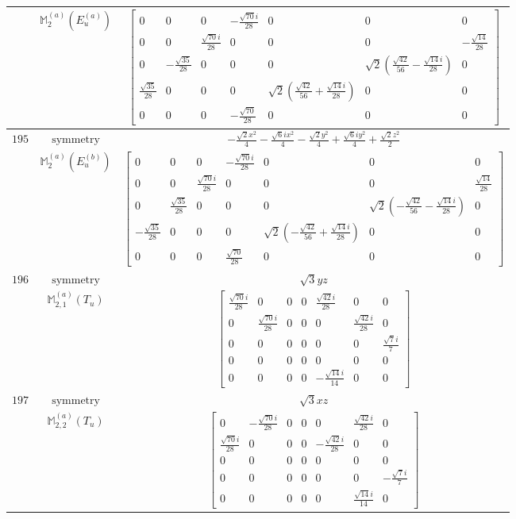 \documentclass[fleqn,8pt,landscape]{jsarticle}
\begin{document}
\begin{longtable}{ccc}
$  $ & $ \mathbb{M}_{2}^{(a)}(E_{u}^{(a)}) $ & $ \begin{bmatrix} 0 & 0 & 0 & - \frac{\sqrt{70} i}{28} & 0 & 0 & 0 \\ 0 & 0 & \frac{\sqrt{70} i}{28} & 0 & 0 & 0 & - \frac{\sqrt{14}}{28} \\ 0 & - \frac{\sqrt{35}}{28} & 0 & 0 & 0 & \sqrt{2} \left(\frac{\sqrt{42}}{56} - \frac{\sqrt{14} i}{28}\right) & 0 \\ \frac{\sqrt{35}}{28} & 0 & 0 & 0 & \sqrt{2} \left(\frac{\sqrt{42}}{56} + \frac{\sqrt{14} i}{28}\right) & 0 & 0 \\ 0 & 0 & 0 & - \frac{\sqrt{70}}{28} & 0 & 0 & 0 \end{bmatrix} $ \\ \hline
$ 195 $ & $ \text{symmetry} $ & $ - \frac{\sqrt{2} x^{2}}{4} - \frac{\sqrt{6} i x^{2}}{4} - \frac{\sqrt{2} y^{2}}{4} + \frac{\sqrt{6} i y^{2}}{4} + \frac{\sqrt{2} z^{2}}{2} $ \\
$  $ & $ \mathbb{M}_{2}^{(a)}(E_{u}^{(b)}) $ & $ \begin{bmatrix} 0 & 0 & 0 & - \frac{\sqrt{70} i}{28} & 0 & 0 & 0 \\ 0 & 0 & \frac{\sqrt{70} i}{28} & 0 & 0 & 0 & \frac{\sqrt{14}}{28} \\ 0 & \frac{\sqrt{35}}{28} & 0 & 0 & 0 & \sqrt{2} \left(- \frac{\sqrt{42}}{56} - \frac{\sqrt{14} i}{28}\right) & 0 \\ - \frac{\sqrt{35}}{28} & 0 & 0 & 0 & \sqrt{2} \left(- \frac{\sqrt{42}}{56} + \frac{\sqrt{14} i}{28}\right) & 0 & 0 \\ 0 & 0 & 0 & \frac{\sqrt{70}}{28} & 0 & 0 & 0 \end{bmatrix} $ \\ \hline
$ 196 $ & $ \text{symmetry} $ & $ \sqrt{3} y z $ \\
$  $ & $ \mathbb{M}_{2,1}^{(a)}(T_{u}) $ & $ \begin{bmatrix} \frac{\sqrt{70} i}{28} & 0 & 0 & 0 & \frac{\sqrt{42} i}{28} & 0 & 0 \\ 0 & \frac{\sqrt{70} i}{28} & 0 & 0 & 0 & \frac{\sqrt{42} i}{28} & 0 \\ 0 & 0 & 0 & 0 & 0 & 0 & \frac{\sqrt{7} i}{7} \\ 0 & 0 & 0 & 0 & 0 & 0 & 0 \\ 0 & 0 & 0 & 0 & - \frac{\sqrt{14} i}{14} & 0 & 0 \end{bmatrix} $ \\ \hline
$ 197 $ & $ \text{symmetry} $ & $ \sqrt{3} x z $ \\
$  $ & $ \mathbb{M}_{2,2}^{(a)}(T_{u}) $ & $ \begin{bmatrix} 0 & - \frac{\sqrt{70} i}{28} & 0 & 0 & 0 & \frac{\sqrt{42} i}{28} & 0 \\ \frac{\sqrt{70} i}{28} & 0 & 0 & 0 & - \frac{\sqrt{42} i}{28} & 0 & 0 \\ 0 & 0 & 0 & 0 & 0 & 0 & 0 \\ 0 & 0 & 0 & 0 & 0 & 0 & - \frac{\sqrt{7} i}{7} \\ 0 & 0 & 0 & 0 & 0 & \frac{\sqrt{14} i}{14} & 0 \end{bmatrix} $ \\ \hline

\end{longtable}
\end{document}
